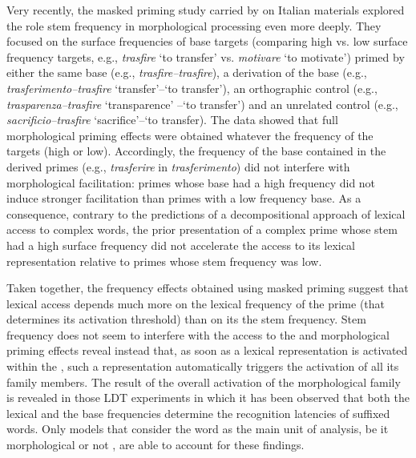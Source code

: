 \documentclass[output=paper]{langsci/langscibook}
\begin{document}
Very recently, the masked priming study carried by %
%
\citet{GiraudoDalMasoEtAl2016} %
%
on Italian materials explored the role
stem frequency in morphological processing even more deeply. They focused on the surface
frequencies of base targets (comparing high vs. low surface frequency
targets, e.g., \emph{trasfire} `to transfer' vs. \emph{motivare} `to motivate')
primed by either the same base (e.g., \emph{trasfire--trasfire}), a
derivation of the base (e.g., \emph{trasferimento--trasfire}
`transfer'--`to transfer'), an orthographic control (e.g.,
\emph{trasparenza--trasfire} `transparence' --`to transfer') and an
unrelated control (e.g., \emph{sacrificio--trasfire} `sacrifice'--`to
transfer). The data showed that full morphological priming effects were
obtained whatever the frequency of the targets (high or low).
Accordingly, the frequency of the base contained in the derived primes
(e.g., \emph{trasferire} in \emph{trasferimento}) did not interfere with
morphological facilitation: primes whose base had a high frequency did
not induce stronger facilitation than primes with a low frequency base.
As a consequence, contrary to the predictions of a decompositional
approach of lexical access to complex words, the prior presentation of a
complex prime whose stem had a high surface frequency did not accelerate
the access to its lexical representation relative to primes whose stem
frequency was low.

Taken together, the frequency effects obtained using  masked priming
 suggest that lexical access depends much more on the lexical
frequency of the prime (that determines its activation threshold) than
on its the stem frequency. Stem frequency does not seem to interfere
with the access to the  and morphological priming effects
reveal instead that, as soon as a lexical representation is
activated within the , such a representation automatically
triggers the activation of all its family members. The result of the
overall activation of the morphological family is revealed in those LDT
experiments in which it has been observed that both the lexical and the
base frequencies determine the recognition latencies of suffixed words.
Only models that consider the word as the main unit of analysis, be it
morphological %
\citep[e.g.,][]{GiraudoVoga2014} %
%
or not %
\citep[e.g.,][]{Baayen11}%
%
, are able to account for
these findings.
\end{document}
